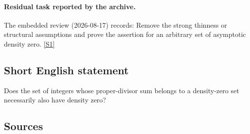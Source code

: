 \documentclass[11pt,a4paper]{article}
\newcommand{\sref}[2]{\hyperlink{source:#1:#2}{[S#2]}}
\begin{document}
\paragraph{Residual task reported by the archive.}

The embedded review (2026-08-17) records: Remove the strong thinness or structural assumptions and prove the assertion for an arbitrary set of asymptotic density zero. \sref{statement}{1}

\subsection{Short English statement}

Does the set of integers whose proper-divisor sum belongs to a density-zero set necessarily also have density zero?

\subsection{Sources}
\end{document}
